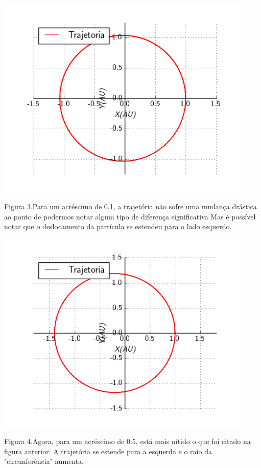 \documentclass[a4paper]{article} %
\begin{document}
\begin{center}
	\includegraphics[width=4.80in,height=3.84in, keepaspectratio=false]{image2_15-50-59-794000.png}
	
	\scriptsize {Figura 3.Para um acréscimo de 0.1, a trajetória não sofre uma mudança drástica ao ponto de podermos notar algum tipo de diferença significativa Mas é possível notar que o deslocamento da partícula se estendeu para o lado esquerdo.}
\end{center}

\begin{center}
	\includegraphics[width=4.80in,height=3.84in, keepaspectratio=false]{image3_15-50-59-818000.png}
	
	\scriptsize {Figura 4.Agora, para um acréscimo de 0.5, está mais nítido o que foi citado na figura anterior. A trajetória se estende para a esquerda e o raio da "circunferência" aumenta.}
\end{center}
\end{document}
